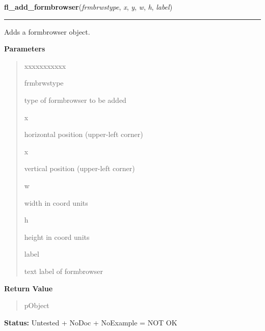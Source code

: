    \label{xformslib:library:fl_add_formbrowser}

    \vspace{0.5ex}

\hspace{.8\funcindent}\begin{boxedminipage}{\funcwidth}

    \raggedright \textbf{fl\_add\_formbrowser}(\textit{frmbrwstype}, \textit{x}, \textit{y}, \textit{w}, \textit{h}, \textit{label})

    \vspace{-1.5ex}

    \rule{\textwidth}{0.5\fboxrule}
\setlength{\parskip}{2ex}
    Adds a formbrowser object.

\setlength{\parskip}{1ex}
      \textbf{Parameters}
      \vspace{-1ex}

      \begin{quote}
        \begin{Ventry}{xxxxxxxxxxx}

          \item[frmbrwstype]

          type of formbrowser to be added

          \item[x]

          horizontal position (upper-left corner)

          \item[x]

          vertical position (upper-left corner)

          \item[w]

          width in coord units

          \item[h]

          height in coord units

          \item[label]

          text label of formbrowser

        \end{Ventry}

      \end{quote}

      \textbf{Return Value}
    \vspace{-1ex}

      \begin{quote}
      pObject

      \end{quote}

\textbf{Status:} Untested + NoDoc + NoExample = NOT OK



    \end{boxedminipage}

